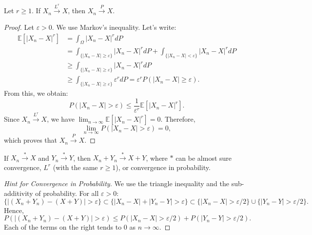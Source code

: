 \begin{proposition}
Let $r \geq 1$. If $X_n \xrightarrow{L^r} X$, then $X_n \xrightarrow{P} X$.
\end{proposition}
\begin{proof}
Let $\varepsilon > 0$. We use Markov's inequality. Let's write:
\begin{align*}
    \mathbb{E}[|X_n - X|^r] &= \int_{\Omega} |X_n - X|^r dP \\
    &= \int_{\{|X_n - X| \geq \varepsilon\}} |X_n - X|^r dP + \int_{\{|X_n - X| < \varepsilon\}} |X_n - X|^r dP \\
    &\geq \int_{\{|X_n - X| \geq \varepsilon\}} |X_n - X|^r dP \\
    &\geq \int_{\{|X_n - X| \geq \varepsilon\}} \varepsilon^r dP = \varepsilon^r P(|X_n - X| \geq \varepsilon).
\end{align*}
From this, we obtain:
\[
P(|X_n - X| > \varepsilon) \leq \frac{1}{\varepsilon^r} \mathbb{E}[|X_n - X|^r].
\]
Since $X_n \xrightarrow{L^r} X$, we have $\lim_{n \to \infty} \mathbb{E}[|X_n - X|^r] = 0$. Therefore,
\[
\lim_{n \to \infty} P(|X_n - X| > \varepsilon) = 0,
\]
which proves that $X_n \xrightarrow{P} X$.
\end{proof}%
\begin{proposition}
If $X_n \xrightarrow{*} X$ and $Y_n \xrightarrow{*} Y$, then $X_n + Y_n \xrightarrow{*} X+Y$, where $*$ can be almost sure convergence, $L^r$ (with the same $r \ge 1$), or convergence in probability.
\end{proposition}%
\begin{proof}[Hint for Convergence in Probability]
We use the triangle inequality and the sub-additivity of probability. For all $\varepsilon > 0$:
\[
\{|(X_n+Y_n) - (X+Y)| > \varepsilon\} \subset \{|X_n-X| + |Y_n-Y| > \varepsilon\} \subset \{|X_n-X| > \varepsilon/2\} \cup \{|Y_n-Y| > \varepsilon/2\}.
\]
Hence,
\[
P(|(X_n+Y_n) - (X+Y)| > \varepsilon) \leq P(|X_n-X| > \varepsilon/2) + P(|Y_n-Y| > \varepsilon/2).
\]
Each of the terms on the right tends to 0 as $n \to \infty$.
\end{proof}%
